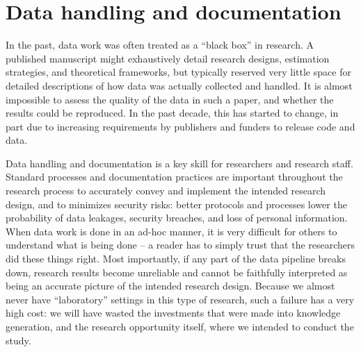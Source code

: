 
\section{Data handling and documentation}

In the past, data work was often treated as a ``black box'' in research.
A published manuscript might exhaustively detail
research designs, estimation strategies, and theoretical frameworks,
but typically reserved very little space for detailed descriptions
of how data was actually collected and handled.
It is almost impossible to assess the quality of the data in such a paper,
and whether the results could be reproduced.
In the past decade, this has started to change,
in part due to increasing requirements by publishers and funders to release code and data.

Data handling and documentation is a key skill for researchers and research staff.
Standard processes and documentation practices
are important throughout the research process to accurately convey
and implement the intended research design,
and to minimizes security risks: 
better protocols and processes lower the probability of data leakages, 
security breaches, and loss of personal information.
When data work is done in an ad-hoc manner,
it is very difficult for others to understand what is being done --
a reader has to simply trust that the researchers did these things right.
Most importantly, if any part of the data pipeline breaks down,
research results become unreliable
and cannot be faithfully interpreted
as being an accurate picture of the intended research design.
Because we almost never have ``laboratory'' settings
in this type of research,
such a failure has a very high cost:
we will have wasted the investments that were made into knowledge generation,
and the research opportunity itself,
where we intended to conduct the study.

